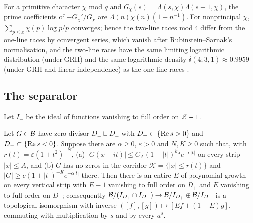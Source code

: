 \begin{proposition}\label{prop:races}
For a primitive character $\chi$ mod $q$ and $G_\chi(s)=\Lambda(s,\chi)\Lambda(s+1,\chi)$, the prime coefficients of $-G_\chi'/G_\chi$ are $\Lambda(n)\chi(n)(1+n^{-1})$. For nonprincipal $\chi$, $\sum_{p\le x}\chi(p)\log p/p$ converges; hence the two-line races mod $4$ differ from the one-line races by convergent series, which vanish after Rubinstein--Sarnak's normalisation, and the two-line races have the same limiting logarithmic distribution (under GRH) and the same logarithmic density $\delta(4;3,1)\approx0.9959$ (under GRH and linear independence) as the one-line races \cite{RubinsteinSarnak,Devin}.
\end{proposition}

\subsection{The separator}

Let $I_-$ be the ideal of functions vanishing to full order on $\mathcal{Z}-1$.

\begin{lemma}\label{lem:separator}
Let $G\in\mathcal{B}$ have zero divisor $D_+\sqcup D_-$ with $D_+\subset\{\operatorname{Re} s>0\}$ and $D_-\subset\{\operatorname{Re} s<0\}$. Suppose there are $\alpha\ge0$, $\varepsilon>0$ and $N,K\ge0$ such that, with $r(t)=\varepsilon(1+t^2)^{-N}$,
(a) $|G(x+it)|\le C_A(1+|t|)^{k_A}e^{-\alpha|t|}$ on every strip $|x|\le A$, and
(b) $G$ has no zeros in the corridor $\mathcal{K}=\{|x|\le r(t)\}$ and $|G|\ge c(1+|t|)^{-K}e^{-\alpha|t|}$ there.
Then there is an entire $E$ of polynomial growth on every vertical strip with $E-1$ vanishing to full order on $D_+$ and $E$ vanishing to full order on $D_-$; consequently $\mathcal{B}/(I_{D_+}\cap I_{D_-})\to\mathcal{B}/I_{D_+}\oplus\mathcal{B}/I_{D_-}$ is a topological isomorphism with inverse $([f],[g])\mapsto[Ef+(1-E)g]$, commuting with multiplication by $s$ and by every $a^s$.
\end{lemma}


